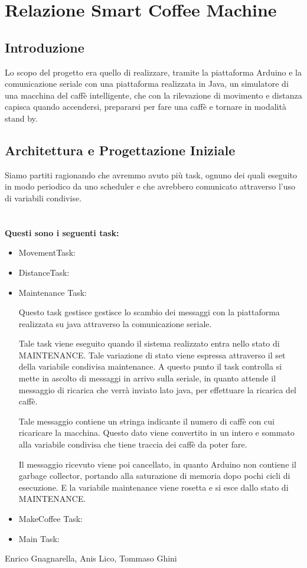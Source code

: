 \documentclass[a4paper]{article}
\begin{document}
\section*{Relazione Smart Coffee Machine} 
\subsection*{Introduzione}
Lo scopo del progetto era quello di realizzare, tramite la piattaforma Arduino e la comunicazione seriale con una piattaforma realizzata in Java, un simulatore di una macchina del caffè intelligente, che con la rilevazione di movimento e distanza capisca quando accendersi, prepararsi per fare una caffè e tornare in modalità stand by.
\subsection*{Architettura e Progettazione Iniziale}
Siamo partiti ragionando che avremmo avuto più task, ognuno dei quali eseguito in modo periodico da uno scheduler e che avrebbero comunicato attraverso l'uso di variabili condivise.\\ \\ \\
\textbf{Questi sono i seguenti task:}
\begin{itemize}
\item {MovementTask}:


\item {DistanceTask}:



\item {Maintenance Task}:

Questo task gestisce gestisce lo scambio dei messaggi con la piattaforma realizzata su java attraverso la comunicazione seriale.

Tale task viene eseguito quando il sistema realizzato entra nello stato di MAINTENANCE. Tale variazione di stato viene espressa attraverso il set della variabile condivisa maintenance.
A questo punto il task controlla si mette in ascolto di messaggi in arrivo sulla seriale, in quanto attende il messaggio di ricarica che verrà inviato lato java, per effettuare la ricarica del caffè.

Tale messaggio contiene un stringa indicante il numero di caffè con cui ricaricare la macchina. Questo dato viene convertito in un intero e sommato alla variabile condivisa che tiene traccia dei caffè da poter fare.

Il messaggio ricevuto viene poi cancellato, in quanto Arduino non contiene il garbage collector, portando alla saturazione di memoria dopo pochi cicli di esecuzione.
E la variabile maintenance viene rosetta e si esce dallo stato di MAINTENANCE.



\item {MakeCoffee Task}:



\item {Main Task}:







\end{itemize}
\newpage
\null
\vfill
Enrico Gnagnarella, Anis Lico, Tommaso Ghini
\clearpage
\end{document}
